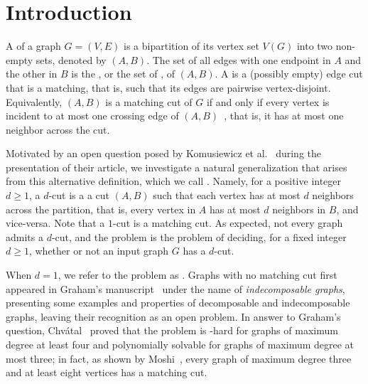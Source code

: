 \section{Introduction}
\label{sec:intro}

 A  of a graph $G = (V, E)$ is a bipartition of its vertex set $V(G)$ into two non-empty sets, denoted by $(A,B)$.
The set of all edges with one endpoint in $A$ and the other in $B$ is the , or the set of , of $(A,B)$.
A  is a (possibly empty) edge cut that is a matching, that is, such that its edges are pairwise vertex-disjoint. Equivalently, $(A, B)$ is a matching cut of $G$ if and only if every vertex is incident to at most one crossing edge of $(A, B)$~\cite{matching_cut_graham, chvatal_matching_cut}, that is, it has at most one neighbor across the cut.

Motivated by an open question posed by Komusiewicz et al.~\cite{matching_cut_ipec} during the presentation of their article,  we investigate a natural generalization that arises from this alternative definition, which we call .
Namely, for a positive integer $d \geq 1$, a $d$-cut is a a cut $(A, B)$ such that each vertex has at most $d$ neighbors across the partition, that is, every vertex in $A$ has at most $d$ neighbors in $B$, and vice-versa. Note that a $1$-cut is a matching cut.
As expected, not every graph admits a $d$-cut, and the  problem is the problem of deciding, for a fixed integer $d \geq 1$, whether or not an input graph $G$ has a $d$-cut.


When $d=1$, we refer to the problem as .
Graphs with no matching cut first appeared in Graham's manuscript~\cite{matching_cut_graham} under the name of \textit{indecomposable graphs}, presenting some examples and properties of decomposable and indecomposable graphs, leaving their recognition as an open problem.
In answer to Graham's question, Chv\'atal~\cite{chvatal_matching_cut} proved that the problem is \NP-hard for graphs of maximum degree at least four and polynomially solvable for graphs of maximum degree at most three; in fact, as shown by Moshi~\cite{matching_cut_moshi}, every graph of maximum degree three and at least eight vertices has a matching cut.

